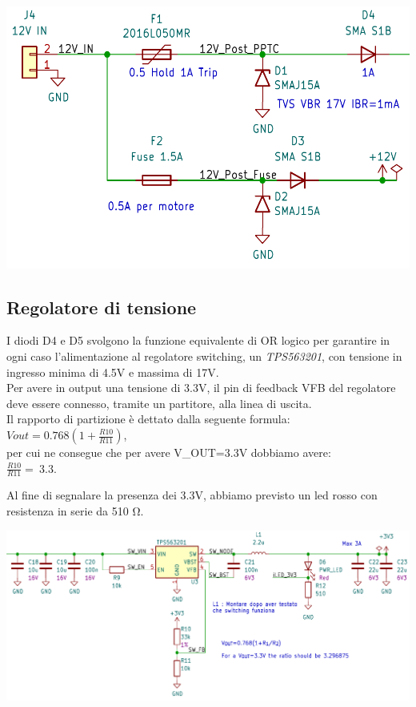 \begin{center}
\includegraphics[scale=0.5]{figures/image105.png}
\captionsetup{type=figure}
\end{center}

\hypertarget{regolatore-di-tensione}{%
\subsection{\texorpdfstring{Regolatore di tensione}{Regolatore di tensione}}\label{regolatore-di-tensione}}

I diodi D4 e D5 svolgono la funzione equivalente di OR logico per garantire in ogni caso l’alimentazione al regolatore switching,
un \emph{TPS563201}, con tensione in ingresso minima di 4.5V e massima di 17V.\\
Per avere in output una tensione di 3.3V, il pin di feedback VFB del regolatore deve essere connesso, tramite un partitore, alla linea di uscita.\\
Il rapporto di partizione è dettato dalla seguente formula:\\
\(Vout = 0.768(1 + \frac{R10}{R11})\),\\
per cui ne consegue che per avere V\_OUT=3.3V dobbiamo avere:\\
\(\frac{R10}{R11} = \ 3.3\).

Al fine di segnalare la presenza dei 3.3V, abbiamo previsto un led rosso
con resistenza in serie da 510 Ω.

\begin{center}
\includegraphics[scale=0.35]{figures/image103.png}
\captionsetup{type=figure}
\end{center}

